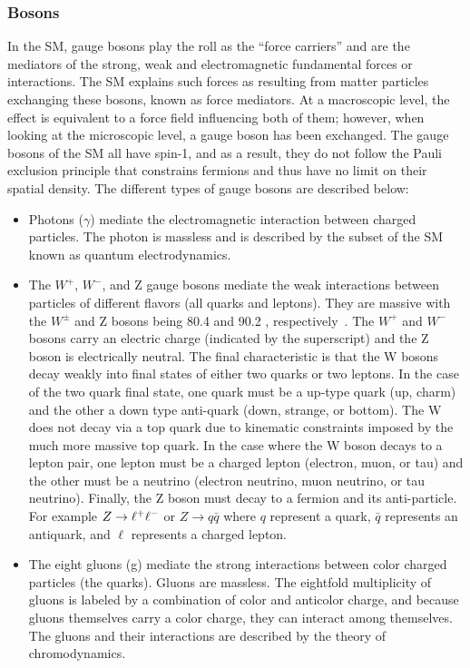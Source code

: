 \subsubsection{Bosons}
\label{sec:intro_sm_bosons}
In the SM, gauge bosons play the roll as the ``force carriers'' and are the
mediators of the strong, weak and electromagnetic fundamental forces or
interactions. The SM explains such forces as resulting from matter particles
exchanging these bosons, known as force mediators. At a macroscopic level, the
effect is equivalent to a force field influencing both of them; however, when
looking at the microscopic level, a gauge boson has been exchanged. The gauge
bosons of the SM all have spin-1, and as a result, they do not follow the Pauli
exclusion principle that constrains fermions and thus have no limit on their
spatial density. The different types of gauge bosons are described below:
\begin{itemize}
\item Photons ($\gamma$) mediate the electromagnetic interaction between
charged particles. The photon is massless and is described by the subset of the
SM known as quantum electrodynamics.
\item The $W^+$, $W^-$, and Z gauge bosons mediate the weak interactions
between particles of different flavors (all quarks and leptons). They are
massive with the $W^{\pm}$ and Z bosons being 80.4 \GeVcc and 90.2 \GeVcc,
respectively~\cite{pdg}. The $W^+$ and $W^-$ bosons carry an electric charge
(indicated by the superscript) and the Z boson is electrically neutral. The
final characteristic is that the W bosons decay weakly into final states of
either two quarks or two leptons. In the case of the two quark final state, one
quark must be a up-type quark (up, charm) and the other a down type anti-quark
(down, strange, or bottom). The W does not decay via a top quark due to
kinematic constraints imposed by the much more massive top quark. In the case
where the W boson decays to a lepton pair, one lepton must be a charged lepton
(electron, muon, or tau) and the other must be a neutrino (electron neutrino,
muon neutrino, or tau neutrino). Finally, the Z boson must decay to a fermion
and its anti-particle. For example $\relax{Z}\to\ell^+\ell^-$ or $Z \to q\bar{q}$ where $q$
represent a quark, $\bar{q}$ represents an antiquark, and $\ell$ represents a
charged lepton.
\item The eight gluons (g) mediate the strong interactions between color
charged particles (the quarks). Gluons are massless. The eightfold multiplicity
of gluons is labeled by a combination of color and anticolor charge, and
because gluons themselves carry a color charge, they can interact
among themselves. The gluons and their interactions are described by the theory
of chromodynamics.
\end{itemize}

